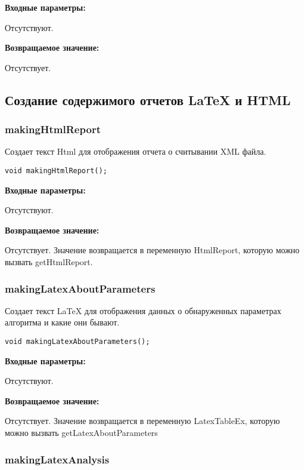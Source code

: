 \documentclass[a4paper,12pt]{article}
\begin{document}
\textbf{Входные параметры:}

Отсутствуют.

\textbf{Возвращаемое значение:}

Отсутствует.


\subsection{Создание содержимого отчетов LaTeX и HTML}

\subsubsection{makingHtmlReport}\label{makingHtmlReport}

Создает текст Html для отображения отчета о считывании XML файла.


\begin{lstlisting}[label=code_syntax_makingHtmlReport,caption=Синтаксис]
void makingHtmlReport();
\end{lstlisting}

\textbf{Входные параметры:}

Отсутствуют.

\textbf{Возвращаемое значение:}

Отсутствует. Значение возвращается в переменную HtmlReport, которую можно вызвать getHtmlReport.


\subsubsection{makingLatexAboutParameters}\label{makingLatexAboutParameters}

Создает текст LaTeX для отображения данных о обнаруженных параметрах алгоритма и какие они бывают.


\begin{lstlisting}[label=code_syntax_makingLatexAboutParameters,caption=Синтаксис]
void makingLatexAboutParameters();
\end{lstlisting}

\textbf{Входные параметры:}

Отсутствуют.

\textbf{Возвращаемое значение:}

Отсутствует. Значение возвращается в переменную LatexTableEx, которую можно вызвать getLatexAboutParameters


\subsubsection{makingLatexAnalysis}\label{makingLatexAnalysis}
\end{document}
